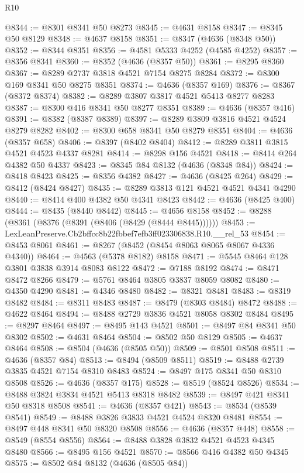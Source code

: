 \begin{lexlean}{R10}
\begin{coremodule}
@8344 := @8301 @8341 @50 @8273
@8345 := @4631 @8158
@8347 := @8345 @50 @8129
@8348 := @4637 @8158
@8351 := @8347 (@4636 (@8348 @50))
@8352 := @8344 @8351
@8356 := @4581 @5333 @4252 (@4585 @4252)
@8357 := @8356 @8341
@8360 := @8352 (@4636 (@8357 @50))
@8361 := @8295 @8360
@8367 := @8289 @2737 @3818 @4521 @7154 @8275 @8284
@8372 := @8300 @169 @8341 @50 @8275 @8351
@8374 := @4636 (@8357 @169)
@8376 := @8367 (@8372 @8374)
@8382 := @8289 @3807 @3817 @4521 @5413 @8277 @8283
@8387 := @8300 @416 @8341 @50 @8277 @8351
@8389 := @4636 (@8357 @416)
@8391 := @8382 (@8387 @8389)
@8397 := @8289 @3809 @3816 @4521 @4524 @8279 @8282
@8402 := @8300 @658 @8341 @50 @8279 @8351
@8404 := @4636 (@8357 @658)
@8406 := @8397 (@8402 @8404)
@8412 := @8289 @3811 @3815 @4521 @4523 @4337 @8281
@8414 := @8298 @156 @4521
@8418 := @8414 @264 @4382 @50 @4337
@8423 := @8345 @84 @8132 (@4636 (@8348 @84))
@8424 := @8418 @8423
@8425 := @8356 @4382
@8427 := @4636 (@8425 @264)
@8429 := @8412 (@8424 @8427)
@8435 := @8289 @3813 @121 @4521 @4521 @4341 @4290
@8440 := @8414 @400 @4382 @50 @4341 @8423
@8442 := @4636 (@8425 @400)
@8444 := @8435 (@8440 @8442)
@8445 := @4656 @8158
@8452 := @8288 (@8361 (@8376 (@8391 (@8406 (@8429 (@8444 @8445))))))
@8453 := LexLeanPreserve.Cb2bffcc8b22fbbef7efb3ff023306838.R10.__rel_53
@8454 := @8453 @8061
@8461 := @8267 (@8452 (@8454 @8063 @8065 @8067 @4336 @4340))
@8464 := @4563 (@5378 @8182) @8158
@8471 := @5545 @8464 @128 @3801 @3838 @3914 @8083 @8122
@8472 := @7188 @8192
@8474 := @8471 @8472 @8266
@8479 := @5761 @8464 @3805 @3837 @8059 @8082
@8480 := @4350 @4290
@8481 := @4346 @8480
@8482 := @8321 @8481
@8483 := @8319 @8482
@8484 := @8311 @8483
@8487 := @8479 (@8303 @8484) @8472
@8488 := @4622 @8464
@8494 := @8488 @2729 @3836 @4521 @8058 @8302 @8484
@8495 := @8297 @8464
@8497 := @8495 @143 @4521
@8501 := @8497 @84 @8341 @50 @8302
@8502 := @4631 @8464
@8504 := @8502 @50 @8129
@8505 := @4637 @8464
@8508 := @8504 (@4636 (@8505 @50))
@8509 := @8501 @8508
@8511 := @4636 (@8357 @84)
@8513 := @8494 (@8509 @8511)
@8519 := @8488 @2739 @3835 @4521 @7154 @8310 @8483
@8524 := @8497 @175 @8341 @50 @8310 @8508
@8526 := @4636 (@8357 @175)
@8528 := @8519 (@8524 @8526)
@8534 := @8488 @3824 @3834 @4521 @5413 @8318 @8482
@8539 := @8497 @421 @8341 @50 @8318 @8508
@8541 := @4636 (@8357 @421)
@8543 := @8534 (@8539 @8541)
@8549 := @8488 @3826 @3833 @4521 @4524 @8320 @8481
@8554 := @8497 @448 @8341 @50 @8320 @8508
@8556 := @4636 (@8357 @448)
@8558 := @8549 (@8554 @8556)
@8564 := @8488 @3828 @3832 @4521 @4523 @4345 @8480
@8566 := @8495 @156 @4521
@8570 := @8566 @416 @4382 @50 @4345
@8575 := @8502 @84 @8132 (@4636 (@8505 @84))

\end{coremodule}
\end{lexlean}
